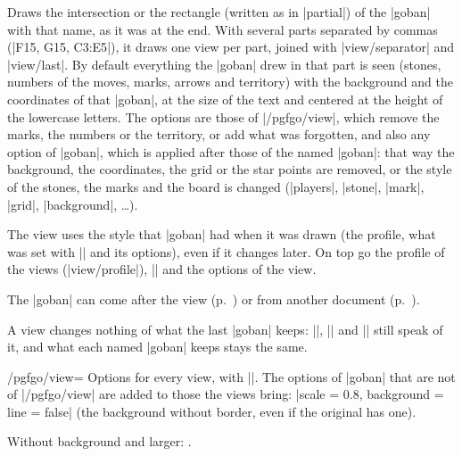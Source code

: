 	\begin{command}{\pgfgoview{}}
		Draws the intersection or the rectangle (written as in |partial|) of the |goban| with that name, as it was at the end. With several parts separated by commas (|{F15, G15, C3:E5}|), it draws one view per part, joined with |view/separator| and |view/last|. By default everything the |goban| drew in that part is seen (stones, numbers of the moves, marks, arrows and territory) with the background and the coordinates of that |goban|, at the size of the text and centered at the height of the lowercase letters. The options are those of |/pgfgo/view|, which remove the marks, the numbers or the territory, or add what was forgotten, and also any option of |goban|, which is applied after those of the named |goban|: that way the background, the coordinates, the grid or the star points are removed, or the style of the stones, the marks and the board is changed (|players|, |stone|, |mark|, |grid|, |background|, \ldots).

		The view uses the style that |goban| had when it was drawn (the profile, what was set with |\pgfgoset| and its options), even if it changes later. On top go the profile of the views (|view/profile|), || and the options of the view.

		The |goban| can come after the view (p.~\pageref{subsec:vistas-antes}) or from another document (p.~\pageref{subsec:exportar}).

		A view changes nothing of what the last |goban| keeps: |\pgfgoscore|, |\pgfgoprisoners| and |\pgfgomovenotes| still speak of it, and what each named |goban| keeps stays the same.

		\begin{codeexample}[]
			\begin{goban}[5, name = board2]
			\end{goban}

		\end{codeexample}
	\end{command}

	\begin{key}{/pgfgo/view=}
		Options for every view, with |\pgfgoset|. The options of |goban| that are not of |/pgfgo/view| are added to those the views bring: |scale = 0.8, background = {line = false}| (the background without border, even if the original has one).

		\begin{codeexample}[]
			Without background and larger: .
		\end{codeexample}
	\end{key}

